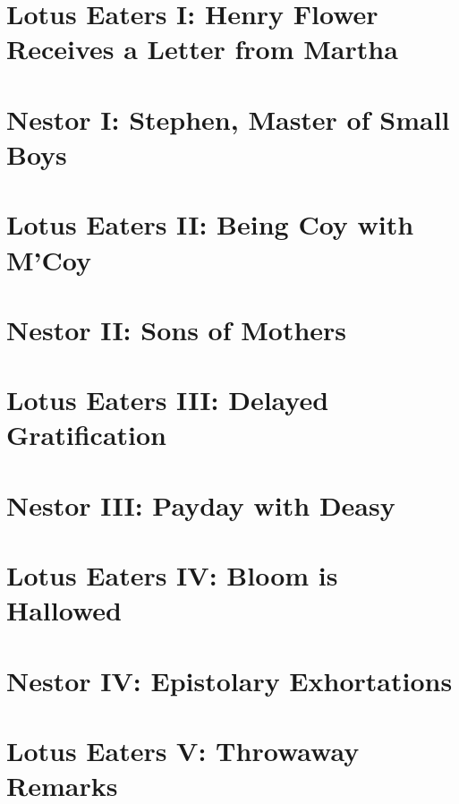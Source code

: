 \newpage


\setcounter{page}{1}

\section*{Lotus Eaters I: Henry Flower Receives a Letter from Martha}


\section*{Nestor I: Stephen, Master of Small Boys}


\section*{Lotus Eaters II: Being Coy with M'Coy}


\section*{Nestor II: Sons of Mothers}


\section*{Lotus Eaters III: Delayed Gratification}


\section*{Nestor III: Payday with Deasy}


\section*{Lotus Eaters IV: Bloom is Hallowed}


\section*{Nestor IV: Epistolary Exhortations}


\section*{Lotus Eaters V: Throwaway Remarks}



